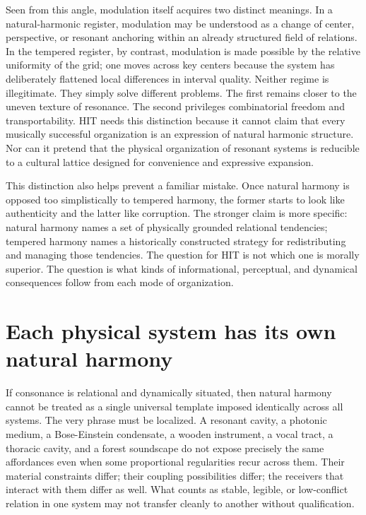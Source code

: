 Seen from this angle, modulation itself acquires two distinct meanings. In a natural-harmonic register, modulation may be understood as a change of center, perspective, or resonant anchoring within an already structured field of relations. In the tempered register, by contrast, modulation is made possible by the relative uniformity of the grid; one moves across key centers because the system has deliberately flattened local differences in interval quality. Neither regime is illegitimate. They simply solve different problems. The first remains closer to the uneven texture of resonance. The second privileges combinatorial freedom and transportability. HIT needs this distinction because it cannot claim that every musically successful organization is an expression of natural harmonic structure. Nor can it pretend that the physical organization of resonant systems is reducible to a cultural lattice designed for convenience and expressive expansion.

This distinction also helps prevent a familiar mistake. Once natural harmony is opposed too simplistically to tempered harmony, the former starts to look like authenticity and the latter like corruption. The stronger claim is more specific: natural harmony names a set of physically grounded relational tendencies; tempered harmony names a historically constructed strategy for redistributing and managing those tendencies. The question for HIT is not which one is morally superior. The question is what kinds of informational, perceptual, and dynamical consequences follow from each mode of organization.


\section{Each physical system has its own natural harmony}


If consonance is relational and dynamically situated, then natural harmony cannot be treated as a single universal template imposed identically across all systems. The very phrase must be localized. A resonant cavity, a photonic medium, a Bose-Einstein condensate, a wooden instrument, a vocal tract, a thoracic cavity, and a forest soundscape do not expose precisely the same affordances even when some proportional regularities recur across them. Their material constraints differ; their coupling possibilities differ; the receivers that interact with them differ as well. What counts as stable, legible, or low-conflict relation in one system may not transfer cleanly to another without qualification.

